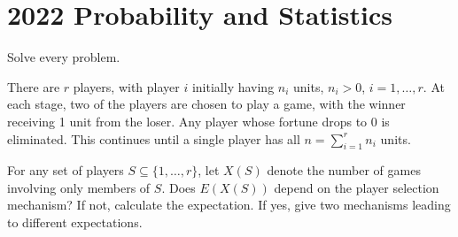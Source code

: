 \section{2022 Probability and Statistics}

Solve every problem.

\begin{exercise}\label{probability:2022:1}
There are $r$ players, with player $i$ initially having $n_i$ units, $n_i > 0$, $i = 1, \ldots, r$. At each stage, two of the players are chosen to play a game, with the winner receiving 1 unit from the loser. Any player whose fortune drops to 0 is eliminated. This continues until a single player has all $n = \sum_{i=1}^r n_i$ units.

For any set of players $S \subseteq \{1,\dots,r\}$, let $X(S)$ denote the number of games involving only members of $S$. Does $E(X(S))$ depend on the player selection mechanism? If not, calculate the expectation. If yes, give two mechanisms leading to different expectations.
\end{exercise}

